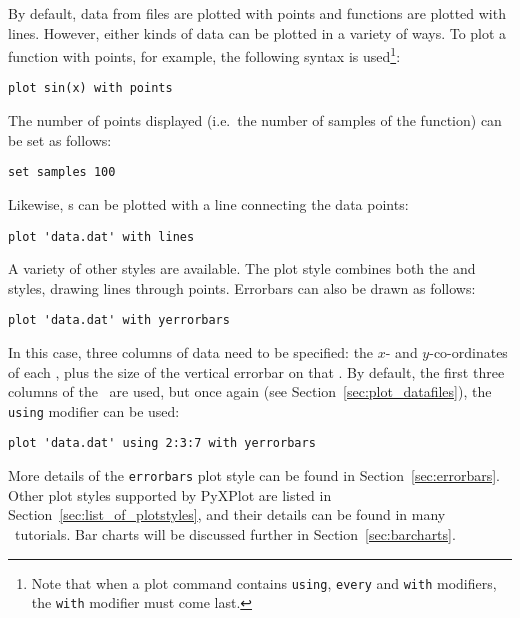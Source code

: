 By default, data from files are plotted with points and functions are plotted
with lines. However, either kinds of data can be plotted in a variety of ways.
To plot a function with points, for example, the following syntax is
used\footnote{Note that when a plot command contains {\tt using}, {\tt every}
and {\tt with} modifiers, the {\tt with} modifier must come
last.}:

\begin{verbatim}
plot sin(x) with points
\end{verbatim}

\noindent The number of points displayed (i.e.\ the number of samples of the
function) can be set as follows:

\begin{verbatim}
set samples 100
\end{verbatim}

\noindent Likewise, \datafile s can be plotted with a line connecting the data
points:

\begin{verbatim}
plot 'data.dat' with lines
\end{verbatim}

A variety of other styles are available. The  plot style
combines both the  and  styles, drawing lines
through points. Errorbars can also be drawn as follows:

\begin{verbatim}
plot 'data.dat' with yerrorbars
\end{verbatim}

\noindent In this case, three columns of data need to be specified: the $x$-
and $y$-co-ordinates of each \datapoint, plus the size of the vertical errorbar
on that \datapoint. By default, the first three columns of the \datafile\ are
used, but once again (see Section~\ref{sec:plot_datafiles}), the {\tt using}
modifier can be used:

\begin{verbatim}
plot 'data.dat' using 2:3:7 with yerrorbars
\end{verbatim}

More details of the {\tt errorbars} plot style can be found in
Section~\ref{sec:errorbars}. Other plot styles supported by PyXPlot are listed in
Section~\ref{sec:list_of_plotstyles}, and their details can be found in many
\gnuplot\ tutorials. Bar charts will be discussed further in
Section~\ref{sec:barcharts}.

